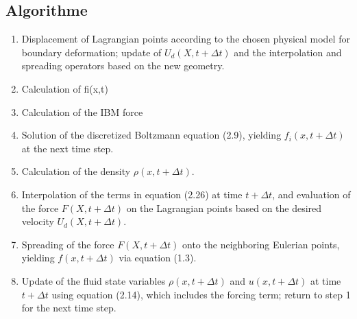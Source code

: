 \subsection{Algorithme}
\begin{enumerate}
	\item Displacement of Lagrangian points according to the chosen physical
    model for boundary deformation; update of $U_d(X,t+\Delta t)$ and the
    interpolation and spreading operators based on the new geometry.

    \item Calculation of fi(x,t)
    
    \item Calculation of the IBM force 

    \item Solution of the discretized Boltzmann equation (2.9), yielding \(
    f_i(x, t + \Delta t) \) at the next time step.

    \item Calculation of the density \( \rho(x, t + \Delta t) \).

    \item Interpolation of the terms in equation (2.26) at time \( t + \Delta t
    \), and evaluation of the force \( F(X, t + \Delta t) \) on the Lagrangian
    points based on the desired velocity \( U_d(X, t + \Delta t) \).

    \item Spreading of the force \( F(X, t + \Delta t) \) onto the neighboring
    Eulerian points, yielding \( f(x, t + \Delta t) \) via equation (1.3).

    \item Update of the fluid state variables \( \rho(x, t + \Delta t) \) and \(
    u(x, t + \Delta t) \) at time \( t + \Delta t \) using equation (2.14),
    which includes the forcing term; return to step 1 for the next time step.
\end{enumerate}